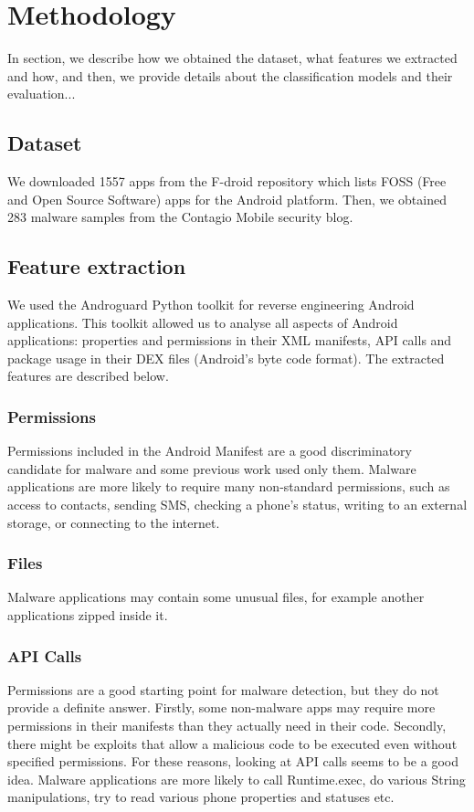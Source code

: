 \section{Methodology}
In section, we describe how we obtained the dataset, what features we extracted and how, and then, we provide details about the classification models and their evaluation...

\subsection{Dataset}
We downloaded 1557 apps from the F-droid \cite{fdroid} repository which lists FOSS (Free and Open Source Software) apps for the Android platform. Then, we obtained 283 malware samples from the Contagio Mobile \cite{contagio} security blog.

\subsection{Feature extraction}
We used the Androguard \cite{androguard} Python toolkit for reverse engineering Android applications. This toolkit allowed us to analyse all aspects of Android applications: properties and permissions in their XML manifests, API calls and package usage in their DEX files (Android's byte code format). The extracted features are described below.

\subsubsection{Permissions}
Permissions included in the Android Manifest are a good discriminatory candidate for malware and some previous work used only them. Malware applications are more likely to require many non-standard permissions, such as access to contacts, sending SMS, checking a phone's status, writing to an external storage, or connecting to the internet.

\subsubsection{Files}
Malware applications may contain some unusual files, for example another applications zipped inside it.

\subsubsection{API Calls}
Permissions are a good starting point for malware detection, but they do not provide a definite answer. Firstly, some non-malware apps may require more permissions in their manifests than they actually need in their code. Secondly, there might be exploits that allow a malicious code to be executed even without specified permissions. For these reasons, looking at API calls seems to be a good idea. Malware applications are more likely to call Runtime.exec, do various String manipulations, try to read various phone properties and statuses etc.

